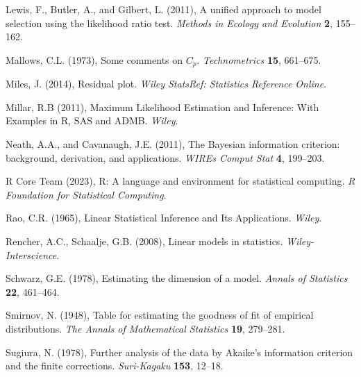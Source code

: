 \phantom{a}

\rff Lewis, F., Butler, A., and Gilbert, L. (2011),
      A unified approach to model selection using the likelihood ratio test.
      {\it Methods in Ecology and Evolution}
      {\bf 2}, {155--162}.

\phantom{a}

\rff Mallows, C.L. (1973),
      Some comments on $C_p$.
      {\it Technometrics}
      {\bf 15}, {661--675}.

\phantom{a}

\rff Miles, J. (2014),
      Residual plot.
      {\it Wiley StatsRef: Statistics Reference Online}.      

\phantom{a}

\rff Millar, R.B (2011),
      Maximum Likelihood Estimation and Inference: With Examples in R, SAS and ADMB.
      {\it Wiley}.      

\phantom{a}

\rff Neath, A.A., and Cavanaugh, J.E. (2011),
      The Bayesian information criterion: background, derivation, and applications.
      {\it WIREs Comput Stat}
      {\bf 4}, {199--203}.
      
\phantom{a}

\rff R Core Team (2023),
      R: A language and environment for statistical computing.
      {\it R Foundation for Statistical Computing}.


\phantom{a}

\rff Rao, C.R. (1965),
      Linear Statistical Inference and Its Applications.
      {\it Wiley}.

\phantom{a}

\rff Rencher, A.C., Schaalje, G.B. (2008),
      Linear models in statistics.
      {\it Wiley-Interscience}.

\phantom{a}

\rff Schwarz, G.E. (1978),
      Estimating the dimension of a model.
      {\it Annals of Statistics}
      {\bf 22}, {461--464}.

\phantom{a}

\rff Smirnov, N. (1948),
    Table for estimating the goodness of fit of empirical distributions.
    {\it The Annals of Mathematical Statistics}
    {\bf 19}, {279--281}.

\phantom{a}

\rff Sugiura, N. (1978),
      Further analysis of the data by Akaike's information criterion and the finite corrections.
      {\it Suri-Kagaku}
      {\bf 153}, {12--18}.

